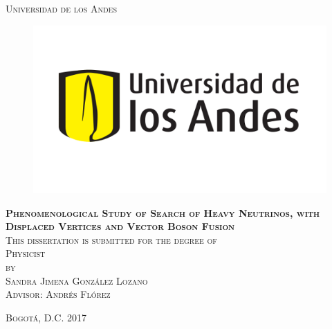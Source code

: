 \documentclass[11pt, oneside]{book}
\begin{document}
\begin{titlepage}
\begin{center}

\textsc{\Large Universidad de los Andes}\\[1em]

\begin{figure}[h]
\begin{center}
\includegraphics[scale=0.4]{logo_uniandes.png}
\end{center}
\end{figure}

\vspace{4em}

\textsc{\huge \textbf{Phenomenological Study of Search of Heavy Neutrinos, with Displaced Vertices and Vector Boson Fusion}}\\[4em]


\textsc{This dissertation is submitted for the degree of}\\[1em]

\textsc{Physicist}\\[1em]

\textsc{by}\\[1em]

\textsc{\Large Sandra Jimena González Lozano}\\[1em]

\textsc{\large Advisor: Andrés Flórez}

\end{center}

\vspace*{\fill}
\textsc{Bogotá, D.C. \hspace*{\fill} 2017}

\end{titlepage}
\end{document}
